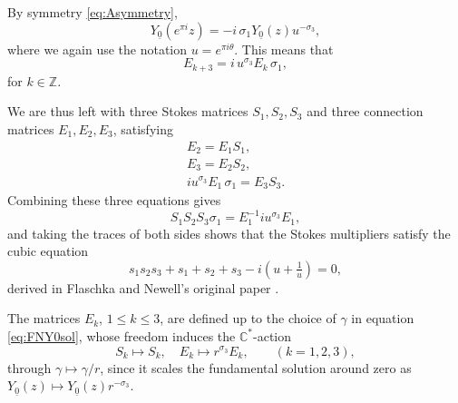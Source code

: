 \documentclass[a4paper,reqno]{amsart}
\numberwithin{equation}{section}
\numberwithin{equation}{section}
\begin{document}
By symmetry \eqref{eq:Asymmetry},
\begin{equation*}
    Y_{\underline{0}}(e^{\pi i}z)=-i\, \sigma_1 Y_{\underline{0}}(z)u^{-\sigma_3},
\end{equation*}
where we again use the notation  $u=e^{\pi i \theta}$. This means that 
\begin{equation*}
    E_{k+3}=i\,u^{\sigma_3}E_k\, \sigma_1,
\end{equation*}
for $k\in\mathbb{Z}$.

We are thus left with three Stokes matrices $S_1,S_2,S_3$ and three connection matrices $E_1,E_2,E_3$, satisfying
\begin{equation}\label{eq:monrelations}
\begin{aligned}
        E_2=E_1S_1,\\
        E_3=E_2S_2,\\
        iu^{\sigma_3} E_1\,\sigma_1=E_3S_3.        
\end{aligned}
\end{equation}
Combining these three equations gives
\begin{equation*}
    S_1S_2S_3\sigma_1= E_1^{-1}iu^{\sigma_3}E_1,
\end{equation*}
and taking the traces of both sides shows that the Stokes multipliers satisfy the cubic equation
\begin{equation} \label{eq:cubicFN}
    s_1s_2s_3 +s_1+s_2+s_3- i (u+\tfrac{1}{u})=0,
\end{equation}
derived in Flaschka and Newell's original paper \cite[Eq. (3.24)]{flaschkanewell}.

The matrices $E_{k}$, $1\leq k\leq 3$, are defined up to the choice of $\gamma$ in equation \eqref{eq:FNY0sol}, whose freedom induces the $\mathbb{C}^*$-action
\begin{equation} \label{eq:scalingactionFNPII}
  S_k\mapsto S_k,\quad  E_k\mapsto r^{\sigma_3} E_k,\qquad (k=1,2,3),
\end{equation}
through $\gamma\mapsto \gamma/r$, since it scales the fundamental solution around zero as $Y_{\underline{0}}(z)\mapsto Y_{\underline{0}}(z)r^{-\sigma_3}$.
\end{document}
